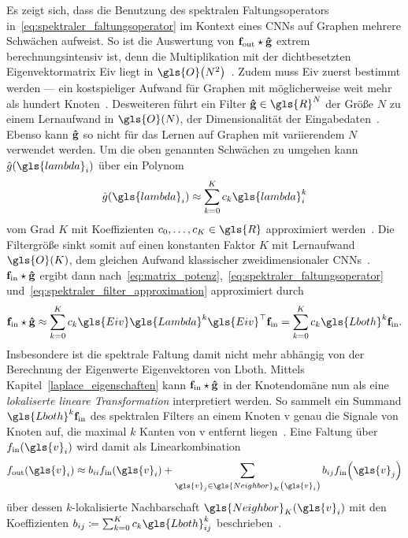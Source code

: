 Es zeigt sich, dass die Benutzung des spektralen Faltungsoperators in~\eqref{eq:spektraler_faltungsoperator} im Kontext eines \glspl{CNN} auf Graphen mehrere Schwächen aufweist.
So ist \zB{} die Auswertung von $\mathbf{f}_{\mathrm{out}} \star \mathbf{\hat g}$ extrem berechnungsintensiv ist, denn die Multiplikation mit der dichtbesetzten Eigenvektormatrix \gls{Eiv} liegt in $\gls{O}\left(N^2\right)$~\cite{Defferrard}.
Zudem muss \gls{Eiv} zuerst bestimmt werden — ein kostspieliger Aufwand für Graphen mit möglicherweise weit mehr als hundert Knoten~\cite{gcn}.
Desweiteren führt ein Filter $\ve{\hat g} \in \gls{R}^N$ der Größe $N$ zu einem Lernaufwand in $\gls{O}\left(N\right)$, \dhe{} der Dimensionalität der Eingabedaten~\cite{Defferrard}.
Ebenso kann $\mathbf{\hat g}$ so nicht für das Lernen auf Graphen mit variierendem $N$ verwendet werden.
Um die oben genannten Schwächen zu umgehen kann $\hat g\left(\gls{lambda}_i\right)$ über ein Polynom\begin{equation}
  \hat g\left(\gls{lambda}_i\right) \approx \sum_{k=0}^K c_k\gls{lambda}_i^k
  \label{eq:spektraler_filter_approximation}
\end{equation}
vom Grad $K$ mit Koeffizienten $c_0, \ldots, c_K \in \gls{R}$ approximiert werden~\cite{Hammond, Defferrard}.
Die Filtergröße sinkt somit auf einen konstanten Faktor $K$ mit Lernaufwand $\gls{O}\left(K\right)$, dem gleichen Aufwand klassischer zweidimensionaler \glspl{CNN}~\cite{Defferrard}.
$\mathbf{f}_{\mathrm{in}} \star \mathbf{\hat g}$ ergibt dann nach~\eqref{eq:matrix_potenz},~\eqref{eq:spektraler_faltungsoperator} und~\eqref{eq:spektraler_filter_approximation} approximiert durch~\cite{Defferrard}
\begin{equation}
  \ve{f}_{\mathrm{in}} \star \ve{\hat g} \approx \sum_{k=0}^K c_k\gls{Eiv}\gls{Lambda}^k\gls{Eiv}^{\top}\ve{f}_{\mathrm{in}} = \sum_{k=0}^K c_k \gls{Lboth}^k \ve{f}_{\mathrm{in}}.
  \label{eq:spektraler_faltungsoperator_approximation}
\end{equation}
Insbesondere ist die spektrale Faltung damit nicht mehr abhängig von der Berechnung der Eigenwerte \bzw{} Eigenvektoren von \gls{Lboth}.
Mittels Kapitel~\ref{laplace_eigenschaften} kann $\mathbf{f}_{\mathrm{in}} \star \mathbf{\hat g}$ in der Knotendomäne nun als eine \emph{lokaliserte lineare Transformation} interpretiert werden.
So sammelt ein Summand $\gls{Lboth}^k\ve{f}_{\mathrm{in}}$ des spektralen Filters an einem Knoten \gls{v} genau die Signale von Knoten auf, die maximal $k$ Kanten von \gls{v} entfernt liegen~\cite{Hammond}.
Eine Faltung über $f_{\mathrm{in}}\left(\gls{v}_i\right)$ wird damit als Linearkombination
\begin{equation*}
  f_{\mathrm{out}}\left(\gls{v}_i\right) \approx b_{ii} f_{\mathrm{in}}\left(\gls{v}_i\right) + \sum_{\gls{v}_j \in \gls{Neighbor}_K\left(\gls{v}_i\right)} b_{ij} f_{\mathrm{in}}\left(\gls{v}_j\right)
\end{equation*}
über dessen $k$-lokalisierte Nachbarschaft $\gls{Neighbor}_K\left(\gls{v}_i\right)$ mit den Koeffizienten $b_{ij} \coloneqq \sum_{k=0}^K c_k \gls{Lboth}^k_{ij}$ beschrieben~\cite{Shuman}.

